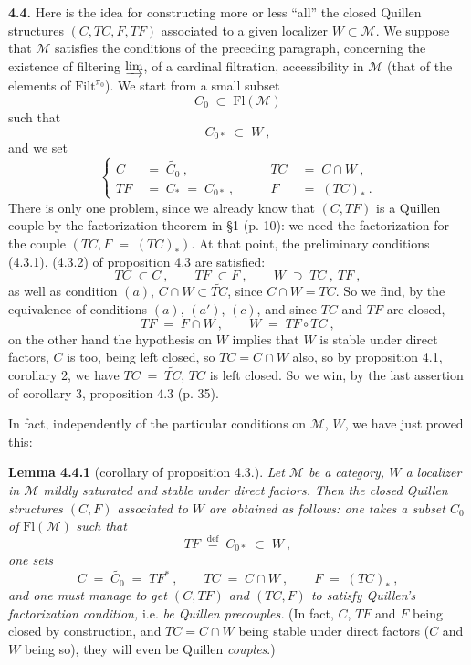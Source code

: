\documentclass[11pt]{article}
\newcommand{\printedpage}[1]{\marginpar{\footnotesize p.~#1}}
\newcommand{\msp}[1]{\marginpar{\footnotesize [#1]}}
\newcommand{\Fl}{\mathrm{Fl}}
\newcommand{\deq}{\overset{\text{def}}{=}}
\begin{document}
\textbf{4.4.} Here is the idea for constructing more or less ``all'' the closed Quillen structures $(C,TC,F,TF)$ associated to a given localizer $W\subset\mathcal{M}$. We suppose that $\mathcal{M}$ satisfies the conditions of the preceding paragraph, concerning the existence of filtering $\varinjlim$, of a cardinal filtration, accessibility in $\mathcal{M}$ (that of the elements of $\mathrm{Filt}^{\pi_0}$). We start from a small subset
\[
C_0\;\subset\;\Fl(\mathcal{M})
\]
such that
\[
C_{0*}\;\subset\;W\ , \tag*{(4.4.1)}
\]
and we set
\[
\left\{
\begin{aligned}
C &\;=\;\widetilde{C_0}\ , &\qquad TC &\;=\;C\cap W\ ,\\
TF &\;=\;C_*\;=\;C_{0*}\ , &\qquad F &\;=\;(TC)_*\ .
\end{aligned}
\right.
\tag*{(4.4.2)}
\]
There is only one problem, since we already know that $(C,TF)$ is a Quillen couple by the factorization theorem in §1 (p. 10): we need the factorization for the couple $(TC,F\;=\;(TC)_*)$. At that point, the preliminary conditions (4.3.1), (4.3.2) of proposition 4.3 are satisfied:
\[
TC\;\subset C\ ,\qquad TF\;\subset F\ ,\qquad W\;\supset\;TC\ ,\ TF\ ,
\]
as well as condition $(a)$, $C\cap W\subset\widetilde{TC}$, since $C\cap W=TC$. So we find, by the equivalence of conditions $(a)$, $(a')$, $(c)$, and since $TC$ and $TF$ are closed,
\[
TF\;=\;F\cap W\ ,\qquad W\;=\;TF\circ TC\ ,
\]
\printedpage{26}
\msp{page 38}
on the other hand the hypothesis on $W$ implies that $W$ is stable under direct factors, $C$ is too, being left closed, so $TC=C{\cap}W$ also, so by proposition 4.1, corollary 2, we have $TC\;=\;\widetilde{TC}$, $TC$ is left closed. So we win, by the last assertion of corollary 3, proposition 4.3 (p. 35).

In fact, independently of the particular conditions on $\mathcal{M}$, $W$, we have just proved this:

\textbf{Lemma 4.4.1} (corollary of proposition 4.3.). \textit{Let $\mathcal{M}$ be a category, $W$ a localizer in $\mathcal{M}$ mildly saturated and stable under direct factors. Then the closed Quillen structures $(C,F)$ associated to $W$ are obtained as follows: one takes a subset $C_0$ of} $\Fl(\mathcal{M})$ \textit{such that}
\[
TF\;\deq\;C_{0*}\;\subset\;W\ ,
\]
\textit{one sets}
\[
C\;=\;\widetilde{C_0}\;=\;TF^*\ ,\qquad TC\;=\;C\cap W\ ,\qquad F\;=\;(TC)_*\ ,
\]
\textit{and one must manage to get $(C,TF)$ and $(TC,F)$ to satisfy Quillen's factorization condition,} i.e. \textit{be Quillen precouples.} (In fact, $C$, $TF$ and $F$ being closed by construction, and $TC=C\cap W$ being stable under direct factors ($C$ and $W$ being so), they will even be Quillen \textit{couples}.)
\end{document}
